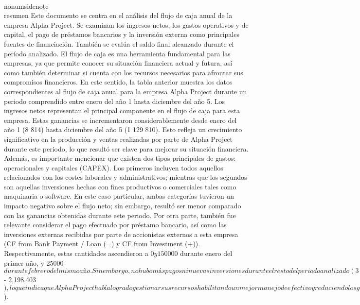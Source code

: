 \\nonumsidenote\\{resumen} Este documento se centra en el análisis del flujo de caja anual de la empresa Alpha Project. Se examinan los ingresos netos, los gastos operativos y de capital, el pago de préstamos bancarios y la inversión externa como principales fuentes de financiación. También se evalúa el saldo final alcanzado durante el período analizado.
El flujo de caja es una herramienta fundamental para las empresas, ya que permite conocer su situación financiera actual y futura, así como también determinar si cuenta con los recursos necesarios para afrontar sus compromisos financieros. En este sentido, la tabla anterior muestra los datos correspondientes al flujo de caja anual para la empresa Alpha Project durante un periodo comprendido entre enero del año 1 hasta diciembre del año 5.
Los ingresos netos representan el principal componente en el flujo de caja para esta empresa. Estas ganancias se incrementaron considerablemente desde enero del año 1 (8 814) hasta diciembre del año 5 (1 129 810). Esto refleja un crecimiento significativo en la producción y ventas realizadas por parte de Alpha Project durante este periodo, lo que resultó ser clave para mejorar su situación financiera.
Además, es importante mencionar que existen dos tipos principales de gastos: operacionales y capitales (CAPEX). Los primeros incluyen todos aquellos relacionados con los costes laborales y administrativos; mientras que los segundos son aquellas inversiones hechas con fines productivos o comerciales tales como maquinaria o software. En este caso particular, ambas categorías tuvieron un impacto negativo sobre el flujo neto; sin embargo, resultó ser menor comparado con las ganancias obtenidas durante este periodo.
Por otra parte, también fue relevante considerar el pago efectuado por préstamo bancario, así como las inversiones externas recibidas por parte de accionistas externos a esta empresa (CF from Bank Payment / Loan (=) y CF from Investment (+)). Respectivamente, estas cantidades ascendieron a 0$ y 150000$ durante enero del primer año, y 25000$ durante febrero del mismo año. Sin embargo, no hubo más pagos ni nuevas inversiones durante el resto del periodo analizado (3-5). Esto es debido a que la empresa AlphaProject no requirió ningún préstamo adicional para financiar sus operaciones a lo largo del periodo analizado o para realizar desarrollos posteriores durante este tiempo.
Finalmente, en cuanto al saldo final observado durante cada uno de estos años, se detecta que hay un crecimiento progresivo en las cifras observadas desde enero del primer año hasta diciembre del quinto (55,969$ - 2,198,403$), lo que indica que Alpha Project había logrado gestionar sus recursos habilitando un mejor manejo de efectivo y reduciendo los gastos en general para lograr un aumento en las ganancias sostenibles durante el extenso periodo analizado (1-5).
En conclusión, se observa que la firma de Alpha Project logró mantener un flujo de efectivo positivo tanto en el corto plazo como en el largo plazo gracias a un buen gestionamiento financiero y una adecuada administración de recursos capitales y operacionales que permitieron fortalecer el saldo efectivo disponible para la empresa al final del periodo analizado (2198403$).
